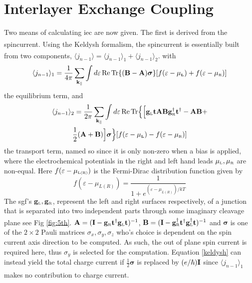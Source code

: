 \documentclass[a4paper, 12pt]{article}
\begin{document}
	\section{Interlayer Exchange Coupling}
	Two means of calculating \gls{iec} are now given. The first is derived from the spincurrent.
	Using the Keldysh formalism\textsuperscript{\textcolor{blue}{\cite{keldyshorig}}}, the spincurrent is essentially built from two components, $\langle j_{n-1}\rangle = \langle j_{n-1}\rangle_1 + \langle j_{n-1}\rangle_2$\textcolor{blue}{\textsuperscript{\cite{keldysh_3}}}.
with 
\begin{equation}\label{keldysh_1}
	\langle j_{n-1}\rangle_1 = \frac{1}{4\pi}\sum_{\bf k_\parallel}\int d\varepsilon \,\rm Re \, Tr \lbrace\bf (B-A)\bm\sigma\rbrace [\mathnormal f(\varepsilon - \mu_{\scriptscriptstyle L})+\mathnormal f(\varepsilon - \mu_{\rm\scriptscriptstyle R})]
\end{equation}
the equilibrium term, and
\begin{multline}\label{keldysh}
	\langle j_{n-1}\rangle_2 = \frac{1}{2\pi}\sum_{\bf k_\parallel}\int d\varepsilon \,\rm Re \, Tr \Big\lbrace\Big\lbrack\bf g_{\rm\scriptscriptstyle L} t A B g_{\rm \scriptscriptstyle R}^\dag t^\dag-AB+\\{\rm\frac{1}{2}} \bf(A+B)\Big\rbrack\bm\sigma\Big\rbrace [\mathnormal f(\varepsilon - \mu_{\scriptscriptstyle L})-\mathnormal f(\varepsilon - \mu_{\rm\scriptscriptstyle R})]
\end{multline}
the transport term, named so since it is only non-zero when a bias is applied, where the electrochemical potentials in the right and left hand leads $\mu_{\rm \scriptscriptstyle L}, \mu_{\rm \scriptscriptstyle R}$ are non-equal. Here $f(\varepsilon-\mu_{\rm \scriptscriptstyle L(R)})$ is the Fermi-Dirac distribution function given by
\begin{equation}\label{fermi}
	f(\varepsilon-\mu_{\scriptscriptstyle L(R)})=\frac{1}{1+e^{(\varepsilon-\mu_{\scriptscriptstyle L(R)})/kT}}
\end{equation}
The \gls{sgf}'s $\bf g_{\rm\scriptscriptstyle L}, g_{\rm\scriptscriptstyle R}$, represent the left and right surfaces respectively, of a junction that is separated into two independent parts through some imaginary cleavage plane\textcolor{blue}{\textsuperscript{\cite{kubo2}}} see Fig \ref{fig:5th}.
$\bf A = (I - g_{\rm\scriptscriptstyle R}t^\dag g_{\rm\scriptscriptstyle L}t)^{\rm-1}$, $\bf B = (I -g_{\rm\scriptscriptstyle R}^\dag t^\dag g_{\rm\scriptscriptstyle L}^\dag t)^{\rm -1}$ and $\bm \sigma$ is one of the $2\times 2$ Pauli matrices $\sigma_x, \sigma_y, \sigma_z$ who's choice is dependent on the spin current axis direction to be computed. As such, the out of plane spin current is required here, thus $\sigma_y$ is selected for the computation. Equation \eqref{keldysh} can instead yield the total charge current if $\frac{1}{2}\bm\sigma$ is replaced by $(e/\hbar)\bf I $ since $\langle j_{n-1}\rangle_1$ makes no contribution to charge current\textcolor{blue}{\textsuperscript{\cite{keldysh_2}}}.
\end{document}
